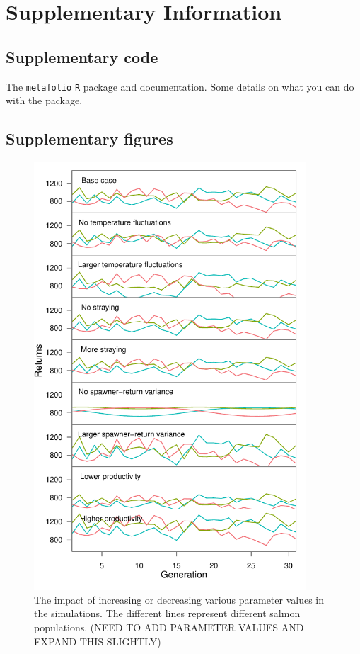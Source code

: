 \section{Supplementary Information}

\subsection{Supplementary code}

The \texttt{metafolio} \texttt{R} package and documentation. Some
details on what you can do with the package.

\subsection{Supplementary figures}

\begin{figure}[htbp]
\centering
\includegraphics[width=4.0in]{../examples/figure/plot-various-options-ts-3pops.pdf}
\caption{The impact of increasing or decreasing various parameter values in the simulations. The different lines represent different salmon populations. (NEED TO ADD PARAMETER VALUES AND EXPAND THIS SLIGHTLY)}
\label{f:eg-sens}
\end{figure}

